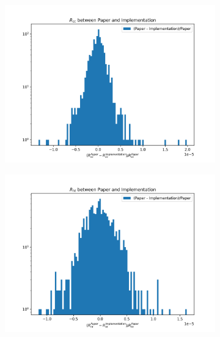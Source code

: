 \documentclass[../main.tex]{subfiles}
\begin{document}
\begin{figure}[ht]
  \centering
  \begin{subfigure}[t]{0.32\linewidth}
    \includegraphics[width=\linewidth]{images/janne/bdte/R_cc_diff.png}
  \end{subfigure}
  \hfill
  \begin{subfigure}[t]{0.32\linewidth}
    \includegraphics[width=\linewidth]{images/janne/bdte/R_cht_diff.png}
  \end{subfigure}
  \hfill
  \begin{subfigure}[t]{0.32\linewidth}

\end{subfigure}
\end{figure}
\end{document}

